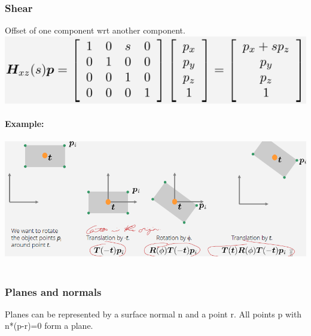 \documentclass{article}
\begin{document}
\subsubsection{Shear}
Offset of one component wrt another component.\\
\includegraphics[scale=0.6]{image31.png}\\\\
\textbf{Example:}\\\\
\includegraphics[scale=0.6]{image32.png}\\\\
\subsubsection{Planes and normals}
Planes can be represented by a surface normal n and a point r. All points p with n*(p-r)=0 form a plane.\\
\end{document}
